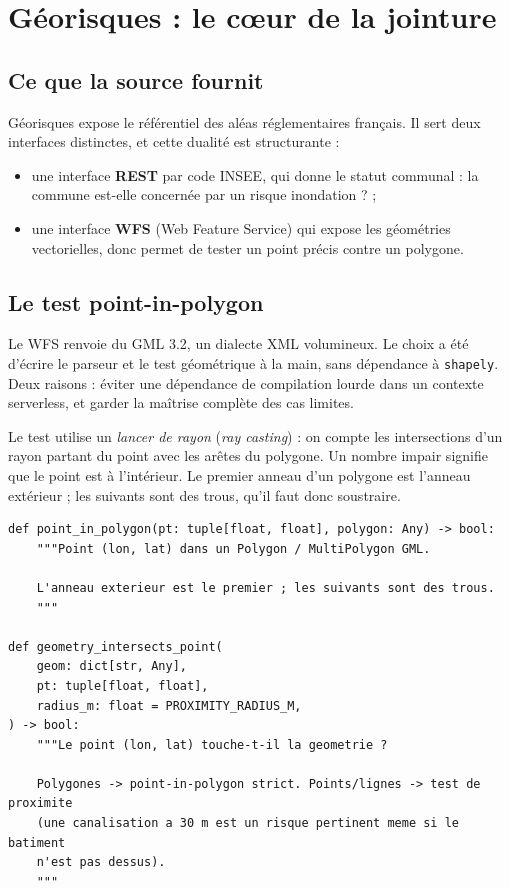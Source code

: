 \section{Géorisques : le cœur de la jointure}

\subsection{Ce que la source fournit}

Géorisques expose le référentiel des aléas réglementaires français. Il sert
deux interfaces distinctes, et cette dualité est structurante :

\begin{itemize}[leftmargin=1.4em]
  \item une interface \textbf{REST} par code INSEE, qui donne le statut
        communal : \og la commune est-elle concernée par un risque
        inondation ? \fg{} ;
  \item une interface \textbf{WFS} (Web Feature Service) qui expose les
        géométries vectorielles, donc permet de tester un point précis contre
        un polygone.
\end{itemize}

\subsection{Le test point-in-polygon}

Le WFS renvoie du GML 3.2, un dialecte XML volumineux. Le choix a été d'écrire
le parseur et le test géométrique à la main, sans dépendance à
\texttt{shapely}. Deux raisons : éviter une dépendance de compilation lourde
dans un contexte serverless, et garder la maîtrise complète des cas limites.

Le test utilise un \emph{lancer de rayon} (\emph{ray casting}) : on compte les
intersections d'un rayon partant du point avec les arêtes du polygone. Un
nombre impair signifie que le point est à l'intérieur. Le premier anneau d'un
polygone est l'anneau extérieur ; les suivants sont des trous, qu'il faut donc
soustraire.

\begin{lstlisting}[caption={Signature du test géométrique et gestion des
géométries non polygonales
(\fichier{backend/app/connectors/georisques\_wfs.py}).},label={lst:pip}]
def point_in_polygon(pt: tuple[float, float], polygon: Any) -> bool:
    """Point (lon, lat) dans un Polygon / MultiPolygon GML.

    L'anneau exterieur est le premier ; les suivants sont des trous.
    """

def geometry_intersects_point(
    geom: dict[str, Any],
    pt: tuple[float, float],
    radius_m: float = PROXIMITY_RADIUS_M,
) -> bool:
    """Le point (lon, lat) touche-t-il la geometrie ?

    Polygones -> point-in-polygon strict. Points/lignes -> test de proximite
    (une canalisation a 30 m est un risque pertinent meme si le batiment
    n'est pas dessus).
    """
\end{lstlisting}

